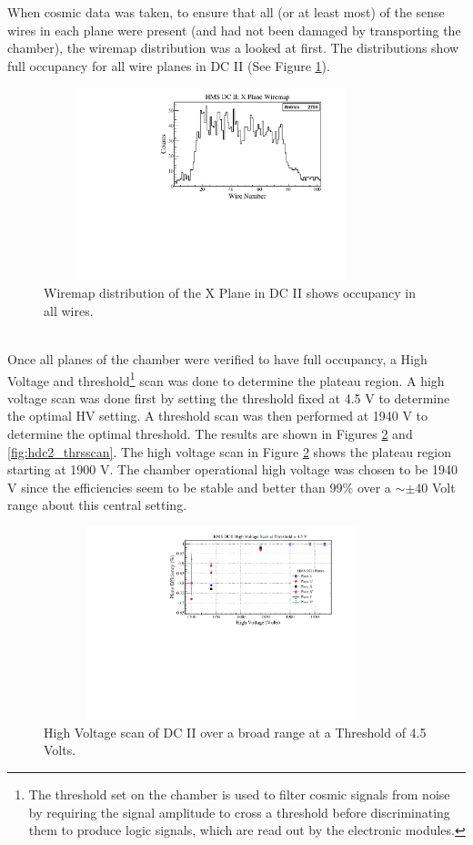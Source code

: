\documentclass[letterpaper, 10 pt, conference]{ieeeconf}  %
\begin{document}
When cosmic data was taken, to ensure that all (or at least most) of the sense wires in each plane were present (and had not been damaged by transporting the chamber), the wiremap distribution was
a looked at first. The distributions show full occupancy for all wire planes in DC II (See Figure \ref{fig:hdc2_wiremap}).  
\begin{figure}[h!]
  \centering
  \includegraphics[width=3.8in, height=2.2in]{dc2_tests/hdc2_xmap.pdf}
  \caption{Wiremap distribution of the X Plane in DC II shows occupancy in all wires.}
  \label{fig:hdc2_wiremap}
\end{figure} \\
Once all planes of the chamber were verified to have full occupancy, a High Voltage and threshold\footnote{The threshold set on the chamber is used to filter cosmic signals from noise by requiring 
the signal amplitude to cross a threshold before discriminating them to produce logic signals, which are read out by the electronic modules.} scan was done to determine the plateau region. A high voltage scan was done first
by setting the threshold fixed at 4.5 V to determine the optimal HV setting. A threshold scan was then performed at 1940 V to determine the optimal threshold. The results are shown in Figures \ref{fig:hdc2_hvscan}
and \ref{fig:hdc2_thrsscan}. The high voltage scan in Figure \ref{fig:hdc2_hvscan} shows the plateau region starting at 1900 V. The chamber operational high voltage was chosen to be 1940 V since the efficiencies seem
to be stable and better than 99$\%$ over a $\sim\pm$40 Volt range about this central setting.
\begin{figure}[h!]
  \centering
  \includegraphics[width=4.1in, height=2.2in]{dc2_tests/dc2_hvscan_thrs45.pdf}
  \caption{High Voltage scan of DC II over a broad range at a Threshold of 4.5 Volts.}
  \label{fig:hdc2_hvscan}
\end{figure} 
\end{document}
